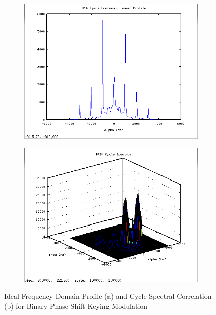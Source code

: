 \begin{figure}
\centering
\begin{subfigure}{.49\textwidth}
\centering
\includegraphics[width=\linewidth]{../img/Report_BPSK_Ia_Ideal.png}
  \caption{ }
\end{subfigure}
\begin{subfigure}{.49\textwidth}
  \centering
  \includegraphics[width=\linewidth]{../img/Report_BPSK_Sxa_Ideal.png}
  \caption{ }
\end{subfigure}
\caption{Ideal Frequency Domain Profile (a) and Cycle Spectral Correlation (b)
for Binary Phase Shift Keying Modulation}
\label{fig:IdealBPSKCyclo}
\end{figure}


